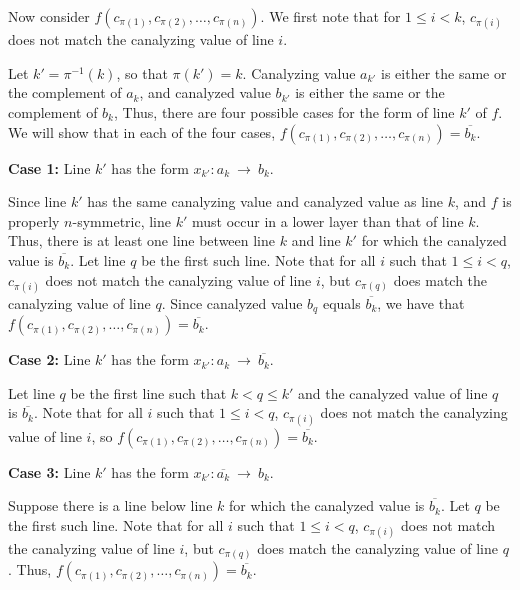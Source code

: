 Now consider $f(c_{\pi(1)}, c_{\pi(2)}, \ldots, c_{\pi(n)})$.  We
first note that for $1 \leq i < k$, $c_{\pi(i)}$ does not match the
canalyzing value of line $i$.

Let $k' = \pi^{-1}(k)$, so that $\pi(k') = k$.  Canalyzing value
$a_{k'}$ is either the same or the complement of $a_k$, and canalyzed
value $b_{k'}$ is either the same or the complement of $b_k$, Thus,
there are four possible cases for the form of line $k'$ of $f$.  We
will show that in each of the four cases, $f(c_{\pi(1)}, c_{\pi(2)},
\ldots, c_{\pi(n)}) = \overline{b_k}$.

\medskip

\noindent
{\bf Case 1:} Line $k'$ has the form  $x_{k'} : a_k ~\longrightarrow~ b_k$.  

\smallskip

Since line $k'$
has the same canalyzing value and canalyzed value as line $k$, and
$f$ is properly $n$-symmetric, line $k'$ must occur in a lower layer
than that of line $k$.  Thus, there is at least one line between
line $k$ and line $k'$ for which the canalyzed value is $\overline{b_k}$.
Let line $q$ be the first such line.  Note that for all $i$ such
that $1 \leq i < q$, $c_{\pi(i)}$ does not match the canalyzing
value of line $i$, but $c_{\pi(q)}$ does match the canalyzing value
of line $q$.  Since canalyzed value $b_q$ equals $\overline{b_k}$,
we have that $f(c_{\pi(1)}, c_{\pi(2)}, \ldots, c_{\pi(n)}) =
\overline{b_k}$.

\medskip

\noindent
{\bf Case 2:} Line $k'$ has the form $x_{k'} : a_k ~\longrightarrow~ \overline{b_k}$.

\smallskip

Let line $q$ be the first line such that $k < q \leq k'$ and
the canalyzed value of line $q$ is $\overline{b_k}$.
Note that for all $i$ such that $1 \leq i < q$, 
$c_{\pi(i)}$ does not match the canalyzing value of line $i$,
so $f(c_{\pi(1)}, c_{\pi(2)}, \ldots, c_{\pi(n)}) = \overline{b_k}$.

\medskip

\noindent
{\bf Case 3:} Line $k'$ has the form $x_{k'} : \overline{a_k} ~\longrightarrow~ b_k$. 

\smallskip

Suppose there is a line below line $k$ for which the canalyzed
value is $\overline{b_k}$.  Let $q$ be the first such line.  Note
that for all $i$ such that $1 \leq i < q$, $c_{\pi(i)}$ does not
match the canalyzing value of line $i$, but $c_{\pi(q)}$ does match
the canalyzing value of line $q$.  Thus, $f(c_{\pi(1)}, c_{\pi(2)},
\ldots, c_{\pi(n)}) = \overline{b_k}$.

